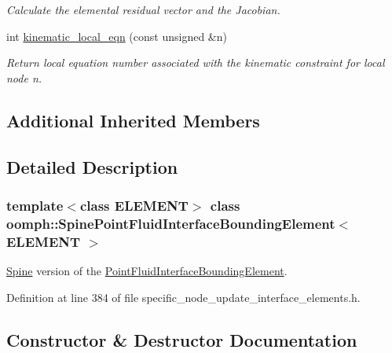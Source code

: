 \begin{DoxyCompactItemize}
\begin{DoxyCompactList}\small\item\em Calculate the elemental residual vector and the Jacobian. \end{DoxyCompactList}\item 
int \hyperlink{classoomph_1_1SpinePointFluidInterfaceBoundingElement_a7c1c2f31b1d9f9c925889ad199a78947}{kinematic\+\_\+local\+\_\+eqn} (const unsigned \&n)
\begin{DoxyCompactList}\small\item\em Return local equation number associated with the kinematic constraint for local node n. \end{DoxyCompactList}\end{DoxyCompactItemize}
\subsection*{Additional Inherited Members}


\subsection{Detailed Description}
\subsubsection*{template$<$class E\+L\+E\+M\+E\+NT$>$\newline
class oomph\+::\+Spine\+Point\+Fluid\+Interface\+Bounding\+Element$<$ E\+L\+E\+M\+E\+N\+T $>$}

\hyperlink{classoomph_1_1Spine}{Spine} version of the \hyperlink{classoomph_1_1PointFluidInterfaceBoundingElement}{Point\+Fluid\+Interface\+Bounding\+Element}. 

Definition at line 384 of file specific\+\_\+node\+\_\+update\+\_\+interface\+\_\+elements.\+h.



\subsection{Constructor \& Destructor Documentation}
\mbox{\label{classoomph_1_1SpinePointFluidInterfaceBoundingElement_a4cda221f4ee0528cc89076809f54c64e}} 
